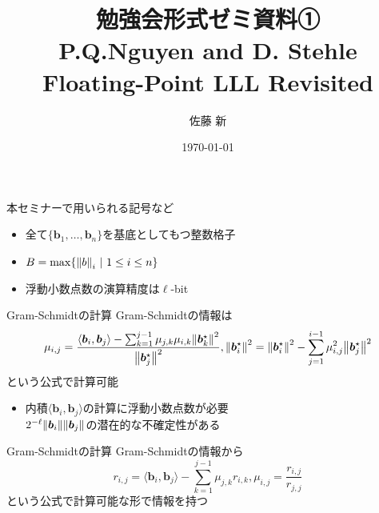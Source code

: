 \documentclass[12pt,aspectratio=169,xcolor=dvipsnames,table,dvipdfmx, leqno]{beamer}
\title[勉強会]{勉強会形式ゼミ資料①\\P.Q.Nguyen and D. Stehle Floating-Point LLL Revisited}
\author[佐藤]{佐藤 新}
\date{\today}
\begin{document}
\maketitle

\begin{frame}
    本セミナーで用いられる記号など
    \begin{itemize}
        \item 全て$\{\bm{b}_1,\ldots,\bm{b}_n\}$を基底としてもつ整数格子
        \item $B=\max\{\norm{b}_i~|~1\le i\le n\}$
        \item 浮動小数点数の演算精度は$\ell$-bit
    \end{itemize}
\end{frame}

\begin{frame}{Gram-Schmidtの計算}
    Gram-Schmidtの情報は
    \[
    \mu_{i, j}=\frac{\langle \bm{b}_i, \bm{b}_j\rangle-\sum_{k=1}^{j-1}\mu_{j, k}\mu_{i, k}\norm{\bm{b}_k^\star}^2}{\norm{\bm{b}_j^\star}^2}, \norm{\bm{b}_i^\star}^2=\norm{\bm{b}_i^\star}^2-\sum_{j=1}^{i-1}\mu_{i, j}^2\norm{\bm{b}_j^\star}^2
    \]
    という公式で計算可能

    \begin{itemize}
        \item 内積$\langle \bm{b}_i, \bm{b}_j\rangle$の計算に浮動小数点数が必要\\
        \quad\quad $2^{-\ell}\norm{\bm{b}_i}\norm{\bm{b}_j}$の潜在的な不確定性がある
    \end{itemize}
\end{frame}

\begin{frame}{Gram-Schmidtの計算}
    Gram-Schmidtの情報から
    \[
    r_{i, j}=\langle \bm{b}_i, \bm{b}_j\rangle-\sum_{k=1}^{j-1}\mu_{j, k}r_{i, k}, \mu_{i, j}=\frac{r_{i, j}}{r_{j, j}}
    \]
    という公式で計算可能な形で情報を持つ
\end{frame}
\end{document}
